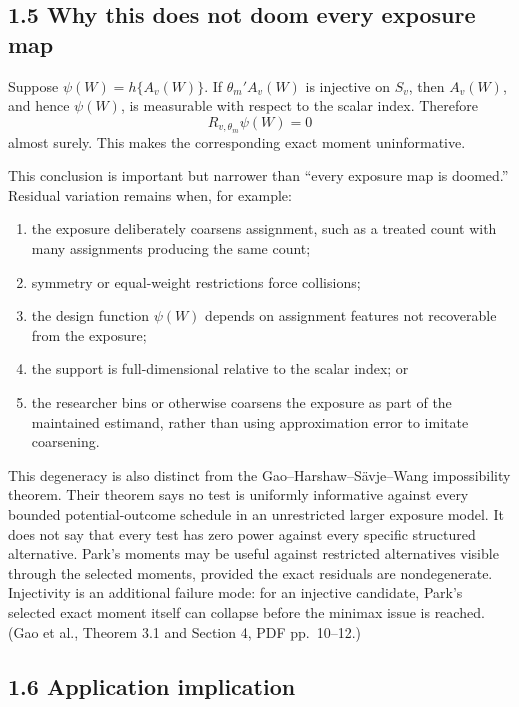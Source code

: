 \documentclass[11pt]{article}
\begin{document}
\subsection*{1.5 Why this does not doom every exposure map}

Suppose \(\psi(W)=h\{A_v(W)\}\). If
\(\theta_m'A_v(W)\) is injective on \(S_v\), then \(A_v(W)\), and hence
\(\psi(W)\), is measurable with respect to the scalar index. Therefore
\[
    R_{v,\theta_m}\psi(W)=0
\]
almost surely. This makes the corresponding exact moment uninformative.

This conclusion is important but narrower than ``every exposure map is
doomed.'' Residual variation remains when, for example:
\begin{enumerate}[leftmargin=2em]
    \item the exposure deliberately coarsens assignment, such as a treated
    count with many assignments producing the same count;
    \item symmetry or equal-weight restrictions force collisions;
    \item the design function \(\psi(W)\) depends on assignment features not
    recoverable from the exposure;
    \item the support is full-dimensional relative to the scalar index; or
    \item the researcher bins or otherwise coarsens the exposure as part of the
    maintained estimand, rather than using approximation error to imitate
    coarsening.
\end{enumerate}

This degeneracy is also distinct from the Gao--Harshaw--S\"avje--Wang
impossibility theorem. Their theorem says no test is uniformly informative
against every bounded potential-outcome schedule in an unrestricted larger
exposure model. It does not say that every test has zero power against every
specific structured alternative. Park's moments may be useful against
restricted alternatives visible through the selected moments, provided the
exact residuals are nondegenerate. Injectivity is an additional failure mode:
for an injective candidate, Park's selected exact moment itself can collapse
before the minimax issue is reached. (Gao et al., Theorem 3.1 and Section 4,
PDF pp.~10--12.)

\subsection*{1.6 Application implication}
\end{document}
